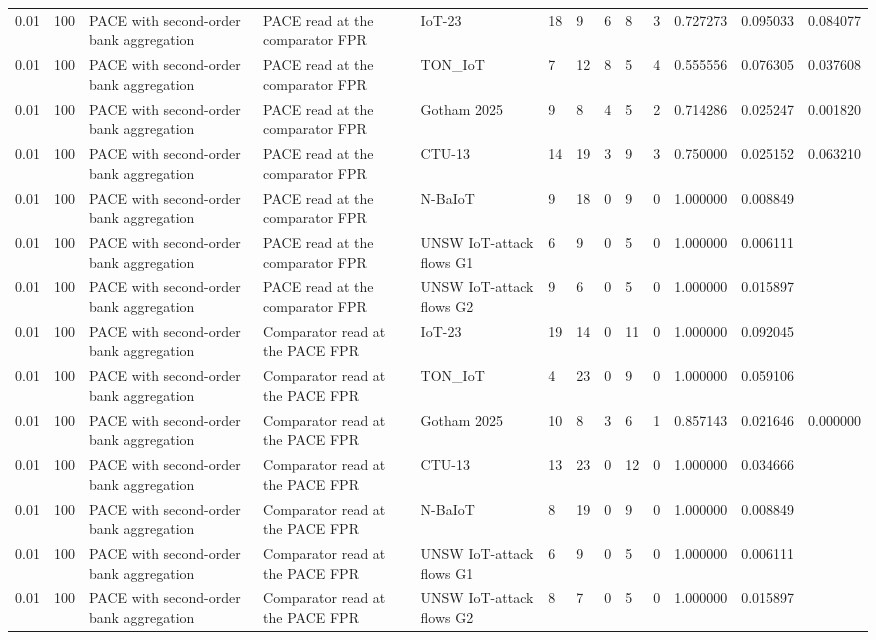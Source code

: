 \begin{tabular}{lllllllllllll}
0.01 & 100 & PACE with second-order bank aggregation & PACE read at the comparator FPR & IoT-23 & 18 & 9 & 6 & 8 & 3 & 0.727273 & 0.095033 & 0.084077 \\
0.01 & 100 & PACE with second-order bank aggregation & PACE read at the comparator FPR & TON\_IoT & 7 & 12 & 8 & 5 & 4 & 0.555556 & 0.076305 & 0.037608 \\
0.01 & 100 & PACE with second-order bank aggregation & PACE read at the comparator FPR & Gotham 2025 & 9 & 8 & 4 & 5 & 2 & 0.714286 & 0.025247 & 0.001820 \\
0.01 & 100 & PACE with second-order bank aggregation & PACE read at the comparator FPR & CTU-13 & 14 & 19 & 3 & 9 & 3 & 0.750000 & 0.025152 & 0.063210 \\
0.01 & 100 & PACE with second-order bank aggregation & PACE read at the comparator FPR & N-BaIoT & 9 & 18 & 0 & 9 & 0 & 1.000000 & 0.008849 &  \\
0.01 & 100 & PACE with second-order bank aggregation & PACE read at the comparator FPR & UNSW IoT-attack flows G1 & 6 & 9 & 0 & 5 & 0 & 1.000000 & 0.006111 &  \\
0.01 & 100 & PACE with second-order bank aggregation & PACE read at the comparator FPR & UNSW IoT-attack flows G2 & 9 & 6 & 0 & 5 & 0 & 1.000000 & 0.015897 &  \\
0.01 & 100 & PACE with second-order bank aggregation & Comparator read at the PACE FPR & IoT-23 & 19 & 14 & 0 & 11 & 0 & 1.000000 & 0.092045 &  \\
0.01 & 100 & PACE with second-order bank aggregation & Comparator read at the PACE FPR & TON\_IoT & 4 & 23 & 0 & 9 & 0 & 1.000000 & 0.059106 &  \\
0.01 & 100 & PACE with second-order bank aggregation & Comparator read at the PACE FPR & Gotham 2025 & 10 & 8 & 3 & 6 & 1 & 0.857143 & 0.021646 & 0.000000 \\
0.01 & 100 & PACE with second-order bank aggregation & Comparator read at the PACE FPR & CTU-13 & 13 & 23 & 0 & 12 & 0 & 1.000000 & 0.034666 &  \\
0.01 & 100 & PACE with second-order bank aggregation & Comparator read at the PACE FPR & N-BaIoT & 8 & 19 & 0 & 9 & 0 & 1.000000 & 0.008849 &  \\
0.01 & 100 & PACE with second-order bank aggregation & Comparator read at the PACE FPR & UNSW IoT-attack flows G1 & 6 & 9 & 0 & 5 & 0 & 1.000000 & 0.006111 &  \\
0.01 & 100 & PACE with second-order bank aggregation & Comparator read at the PACE FPR & UNSW IoT-attack flows G2 & 8 & 7 & 0 & 5 & 0 & 1.000000 & 0.015897 &  \\

\end{tabular}
